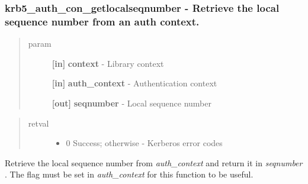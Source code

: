 \documentclass[letterpaper,10pt,english]{sphinxmanual}
\begin{document}
\subsubsection{krb5\_auth\_con\_getlocalseqnumber -  Retrieve the local sequence number from an auth context.}
\label{appdev/refs/api/krb5_auth_con_getlocalseqnumber::doc}\label{appdev/refs/api/krb5_auth_con_getlocalseqnumber:krb5-auth-con-getlocalseqnumber-retrieve-the-local-sequence-number-from-an-auth-context}

\begin{fulllineitems}
\label{appdev/refs/api/krb5_auth_con_getlocalseqnumber:c.krb5_auth_con_getlocalseqnumber}
\end{fulllineitems}

\begin{quote}\begin{description}
\item[{param}] \leavevmode
\textbf{{[}in{]}} \textbf{context} - Library context

\textbf{{[}in{]}} \textbf{auth\_context} - Authentication context

\textbf{{[}out{]}} \textbf{seqnumber} - Local sequence number

\end{description}\end{quote}
\begin{quote}\begin{description}
\item[{retval}] \leavevmode\begin{itemize}
\item {} 
0   Success; otherwise - Kerberos error codes

\end{itemize}

\end{description}\end{quote}

Retrieve the local sequence number from \emph{auth\_context} and return it in \emph{seqnumber} . The {\hyperref[appdev/refs/macros/KRB5_AUTH_CONTEXT_DO_SEQUENCE:KRB5_AUTH_CONTEXT_DO_SEQUENCE]{}} flag must be set in \emph{auth\_context} for this function to be useful.
\end{document}
